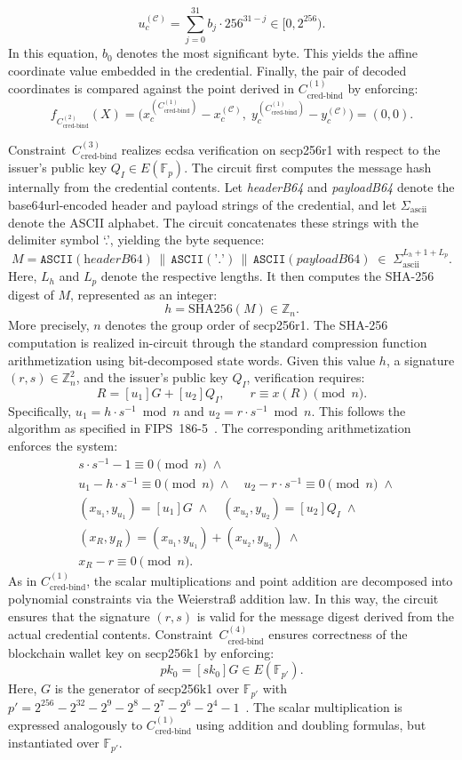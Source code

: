 \[
u_c^{(\mathcal{C})} = \sum_{j=0}^{31} b_j \cdot 256^{31-j} \in [0,2^{256}).
\]
In this equation, $b_0$ denotes the most significant byte. This yields the affine coordinate value embedded in the credential. Finally, the pair of decoded coordinates is compared against the point derived in $C_{\text{cred-bind}}^{(1)}$ by enforcing:
\[
f_{C_{\text{cred-bind}}^{(2)}}(X) =
\bigl(x_c^{(C_{\text{cred-bind}}^{(1)})} - x_c^{(\mathcal{C})},\;
y_c^{(C_{\text{cred-bind}}^{(1)})} - y_c^{(\mathcal{C})}\bigr) = (0,0).
\]

Constraint~$C_{\text{cred-bind}}^{(3)}$ realizes \acrshort{ecdsa} verification on secp256r1 with respect to the issuer’s public key $Q_I \in E(\mathbb{F}_p)$. The circuit first computes the message hash internally from the credential contents. Let \textit{headerB64} and \textit{payloadB64} denote the base64url-encoded header and payload strings of the credential, and let $\Sigma_{\mathrm{ascii}}$ denote the ASCII alphabet. The circuit concatenates these strings with the delimiter symbol `.', yielding the byte sequence:
\[
M = \texttt{ASCII}(\textit{headerB64}) \,\|\, \texttt{ASCII}(\texttt{'.'}) \,\|\, \texttt{ASCII}(\textit{payloadB64})
\;\in\; \Sigma_{\mathrm{ascii}}^{L_h + 1 + L_p}.
\]
Here, $L_h$ and $L_p$ denote the respective lengths. It then computes the
SHA-256 digest of $M$, represented as an integer:
\[
h = \mathrm{SHA256}(M) \in \mathbb{Z}_n.
\]
More precisely, $n$ denotes the group order of secp256r1. The SHA-256 computation is realized in-circuit through the standard compression function arithmetization using bit-decomposed state words. Given this value $h$, a signature $(r,s)\in\mathbb{Z}_n^2$, and the issuer’s public key $Q_I$, verification requires:
\[
R = [u_1]G + [u_2]Q_I, \qquad r \equiv x(R) \pmod{n}.
\]
Specifically, $u_1=h\cdot s^{-1}\bmod n$ and $u_2=r\cdot s^{-1}\bmod n$. This follows the algorithm as specified in FIPS~186-5~\cite{FIPS186-5}. The corresponding arithmetization enforces the system:
\[
\begin{aligned}
	& s\cdot s^{-1} - 1 \equiv 0 \pmod{n} \;\wedge \\
	& u_1 - h\cdot s^{-1} \equiv 0 \pmod{n} \;\wedge \quad u_2 - r\cdot s^{-1} \equiv 0 \pmod{n} \;\wedge \\
	& (x_{u_1},y_{u_1}) = [u_1]G \;\wedge \quad (x_{u_2},y_{u_2}) = [u_2]Q_I \;\wedge \\
	& (x_R,y_R) = (x_{u_1},y_{u_1}) + (x_{u_2},y_{u_2}) \;\wedge \\
	& x_R - r \equiv 0 \pmod{n}.
\end{aligned}
\]
As in $C_{\text{cred-bind}}^{(1)}$, the scalar multiplications and point addition are decomposed into polynomial constraints via the Weierstraß addition law. In this way, the circuit ensures that the signature $(r,s)$ is valid for the message digest derived from the actual credential contents. Constraint~$C_{\text{cred-bind}}^{(4)}$ ensures correctness of the blockchain wallet key on secp256k1 by enforcing:
\[
pk_0 = [sk_0]G \in E(\mathbb{F}_{p'}).
\]
Here, $G$ is the generator of secp256k1 over $\mathbb{F}_{p'}$ with $p' = 2^{256}-2^{32}-2^9-2^8 -2^7-2^6-2^4-1$~\cite{SEC2}. The scalar multiplication is expressed analogously to $C_{\text{cred-bind}}^{(1)}$ using addition and doubling formulas, but instantiated over $\mathbb{F}_{p'}$.

